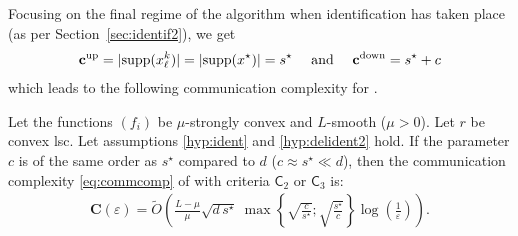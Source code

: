 Focusing on the final regime of the algorithm when identification has taken place (as per Section~\ref{sec:identif2}), we get
\begin{align*}
    \mathbf{c^{\mathrm{up}}} = |\mathrm{supp}(x_\ell^k)| = |\mathrm{supp}(x^\star)| = s^\star \quad\text{ and }\quad \mathbf{c^{\mathrm{down}}} = s^\star + c
\end{align*}
which leads to the following communication complexity for \recoalgo.

\begin{theorem}\label{th:com}
Let the functions $(f_i)$ be $\mu$-strongly convex and $L$-smooth ($\mu>0$). Let $r$ be convex lsc. Let assumptions \ref{hyp:ident} and \ref{hyp:delident2} hold.
If the parameter $c$ is of the same order as $s^\star$ compared to $d$ ($c\approx s^\star \ll d$), then the communication complexity \eqref{eq:commcomp} of \recoalgo with criteria $\mathsf{C}_2$ or $\mathsf{C}_3$ is:
\begin{align*}
     \mathbf{C}(\varepsilon) = \tilde{O}\left( \frac{L-\mu}{\mu} \sqrt{d \, s^\star } ~ \max \left\{\sqrt{\frac{c}{s^\star}};\sqrt{\frac{s^\star}{c}} \right\} \log\left( \frac{1}{\varepsilon} \right) \right).
\end{align*}
\end{theorem}

